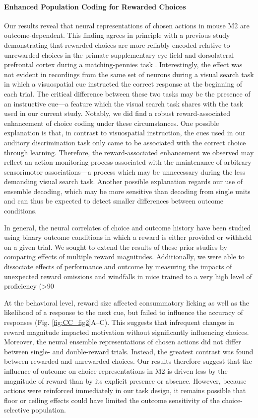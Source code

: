 \paragraph{Enhanced Population Coding for Rewarded Choices}
Our results reveal that neural representations of chosen actions in mouse M2 are outcome-dependent. This finding agrees in principle with a previous study demonstrating that rewarded choices are more reliably encoded relative to unrewarded choices in the primate supplementary eye field and dorsolateral prefrontal cortex during a matching-pennies task \citep{donahue2013cortical}. Interestingly, the effect was not evident in recordings from the same set of neurons during a visual search task in which a visuospatial cue instructed the correct response at the beginning of each trial. The critical difference between these two tasks may be the presence of an instructive cue—a feature which the visual search task shares with the task used in our current study. Notably, we did find a robust reward-associated enhancement of choice coding under these circumstances. One possible explanation is that, in contrast to visuospatial instruction, the cues used in our auditory discrimination task only came to be associated with the correct choice through learning. Therefore, the reward-associated enhancement we observed may reflect an action-monitoring process associated with the maintenance of arbitrary sensorimotor associations—a process which may be unnecessary during the less demanding visual search task. Another possible explanation regards our use of ensemble decoding, which may be more sensitive than decoding from single units and can thus be expected to detect smaller differences between outcome conditions.

In general, the neural correlates of choice and outcome history have been studied using binary outcome conditions in which a reward is either provided or withheld on a given trial. We sought to extend the results of these prior studies by comparing effects of multiple reward magnitudes. Additionally, we were able to dissociate effects of performance and outcome by measuring the impacts of unexpected reward omissions and windfalls in mice trained to a very high level of proficiency (>90%

At the behavioral level, reward size affected consummatory licking as well as the likelihood of a response to the next cue, but failed to influence the accuracy of responses (Fig. \ref{fig:CC_fig2}A–C). This suggests that infrequent changes in reward magnitude impacted motivation without significantly influencing choices. Moreover, the neural ensemble representations of chosen actions did not differ between single- and double-reward trials. Instead, the greatest contrast was found between rewarded and unrewarded choices. Our results therefore suggest that the influence of outcome on choice representations in M2 is driven less by the magnitude of reward than by its explicit presence or absence. However, because actions were reinforced immediately in our task design, it remains possible that floor or ceiling effects could have limited the outcome sensitivity of the choice-selective population.


